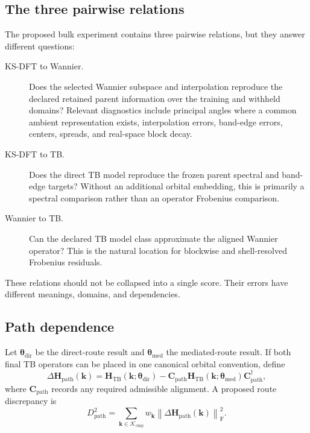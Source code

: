 \subsection*{The three pairwise relations}

The proposed bulk experiment contains three pairwise relations, but they answer
different questions:
\begin{description}
    \item[KS-DFT to Wannier.] Does the selected Wannier subspace and
      interpolation reproduce the declared retained parent information over
      the training and withheld domains? Relevant diagnostics include
      principal angles where a common ambient representation exists,
      interpolation errors, band-edge errors, centers, spreads, and real-space
      block decay.
    \item[KS-DFT to TB.] Does the direct TB model reproduce the frozen parent
      spectral and band-edge targets? Without an additional orbital embedding,
      this is primarily a spectral comparison rather than an operator
      Frobenius comparison.
    \item[Wannier to TB.] Can the declared TB model class approximate the
      aligned Wannier operator? This is the natural location for blockwise and
      shell-resolved Frobenius residuals.
\end{description}
These relations should not be collapsed into a single score. Their errors have
different meanings, domains, and dependencies.

\subsection*{Path dependence}

Let $\boldsymbol\theta_{\mathrm{dir}}$ be the direct-route result and
$\boldsymbol\theta_{\mathrm{med}}$ the mediated-route result. If both final TB
operators can be placed in one canonical orbital convention, define
\begin{equation}
    \Delta\mathbf H_{\mathrm{path}}(\mathbf k)
    =
    \mathbf H_{\mathrm{TB}}
    (\mathbf k;\boldsymbol\theta_{\mathrm{dir}})
    -
    \mathbf C_{\mathrm{path}}
    \mathbf H_{\mathrm{TB}}
    (\mathbf k;\boldsymbol\theta_{\mathrm{med}})
    \mathbf C_{\mathrm{path}}^\dagger,
\end{equation}
where $\mathbf C_{\mathrm{path}}$ records any required admissible alignment.
A proposed route discrepancy is
\begin{equation}
    D_{\mathrm{path}}^2
    =
    \sum_{\mathbf k\in\mathcal K_{\mathrm{cmp}}}
    w_{\mathbf k}
    \left\lVert
        \Delta\mathbf H_{\mathrm{path}}(\mathbf k)
    \right\rVert_{\mathrm F}^2.
\end{equation}

